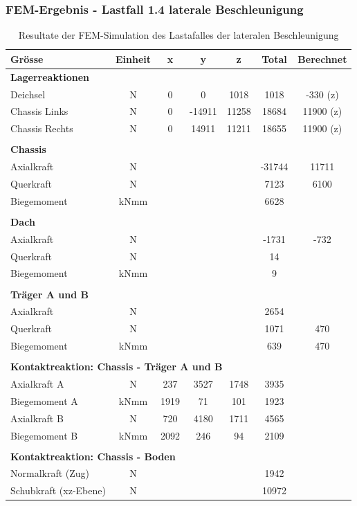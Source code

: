   \subsubsection{FEM-Ergebnis - Lastfall 1.4 laterale Beschleunigung}
  \begin{table}[H]
  \centering
  \begin{tabular}{lcccccc}
  Grösse	&	Einheit	&	x	&	y	&	z	&	Total	&	Berechnet	\\	\hline
  \multicolumn{5}{l}{\textbf{Lagerreaktionen}}									&		&		\\	\thickhline
  Deichsel	&	N	&	0	&	0	&	1018	&	1018	&	-330 (z)	\\
  Chassis Links	&	N	&	0	&	-14911	&	11258	&	18684	&	11900 (z)	\\
  Chassis Rechts	&	N	&	0	&	14911	&	11211	&	18655	&	11900 (z)	\\	\hline	\\
  \multicolumn{5}{l}{\textbf{Chassis}}									&		&		\\	\thickhline
  Axialkraft	&	N	&		&		&		&	-31744	&	11711	\\
  Querkraft	&	N	&		&		&		&	7123	&	6100	\footnotemark \\
  Biegemoment	&	kNmm	&		&		&		&	6628	&		\\	\hline	\\
  \multicolumn{5}{l}{\textbf{Dach}}									&		&		\\	\thickhline
  Axialkraft	&	N	&		&		&		&	-1731	&	-732	\\
  Querkraft	&	N	&		&		&		&	14	&		\\
  Biegemoment	&	kNmm	&		&		&		&	9	&		\\	\hline	\\
  \multicolumn{5}{l}{\textbf{Träger A und B}}													\\	\thickhline
  Axialkraft	&	N	&		&		&		&	2654	&		\\
  Querkraft	&	N	&		&		&		&	1071	&	470	\\
  Biegemoment	&	kNmm	&		&		&		&	639	&	470	\\	\hline	\\
  \multicolumn{5}{l}{\textbf{Kontaktreaktion: Chassis - Träger A und B}}									&		&		\\	\thickhline
  Axialkraft A	&	N	&	237	&	3527	&	1748	&	3935	&		\\
  Biegemoment A	&	kNmm	&	1919	&	71	&	101	&	1923	&		\\
  Axialkraft B	&	N	&	720	&	4180	&	1711	&	4565	&		\\
  Biegemoment B	&	kNmm	&	2092	&	246	&	94	&	2109	&		\\	\hline	\\
  \multicolumn{5}{l}{\textbf{Kontaktreaktion: Chassis - Boden}}									&		&		\\	\thickhline
  Normalkraft (Zug)	&	N	&		&		&		&	1942	&		\\
  Schubkraft (xz-Ebene)	&	N	&		&		&		&	10972	&		\\	\hline
  \end{tabular}
  \caption{Resultate der FEM-Simulation des Lastafalles der lateralen Beschleunigung}
  \label{tab:FEM 1.4}
  \end{table}
